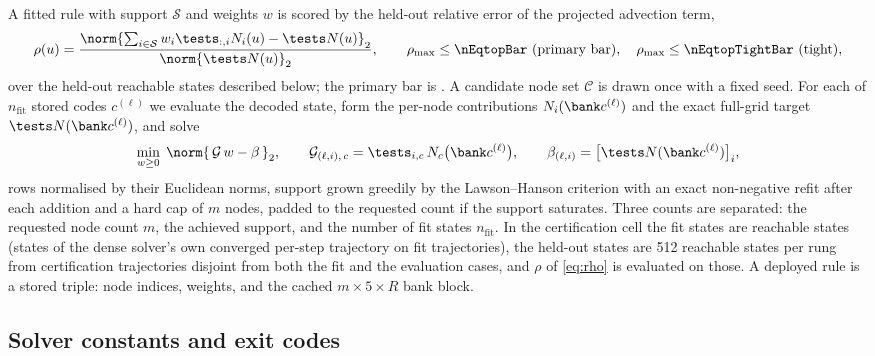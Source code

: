A fitted rule with support $\mathcal S$ and weights $w$ is scored by the
held-out relative error of the projected advection term,
\begin{equation}
  \rho(u)=\frac{\norm{\sum_{i\in\mathcal S}w_i\tests_{:,i}N_i(u)-\tests N(u)}_2}{\norm{\tests N(u)}_2},
  \qquad
  \rho_{\max}\le\nEqtopBar\ \text{(primary bar)},\quad \rho_{\max}\le\nEqtopTightBar\ \text{(tight)},
  \label{eq:rho}
\end{equation}
over the held-out reachable states described below; the primary bar is
\nEqtopBarOrigin. A candidate node set $\mathcal C$ is drawn once with a fixed seed. For each of
$n_{\text{fit}}$ stored codes $c^{(\ell)}$ we evaluate the decoded state, form
the per-node contributions $N_i(\bank c^{(\ell)})$ and the exact full-grid
target $\tests N(\bank c^{(\ell)})$, and solve
\begin{equation}
  \min_{w\ge 0}\;
  \norm{\,\mathcal{G}\,w-\beta\,}_2,
  \qquad
  \mathcal{G}_{(\ell,i),\,c}=\tests_{i,c}\,N_c\big(\bank c^{(\ell)}\big),
  \qquad
  \beta_{(\ell,i)}=\big[\tests N(\bank c^{(\ell)})\big]_i ,
  \label{eq:nnls}
\end{equation}
rows normalised by their Euclidean norms, support grown greedily by the
Lawson--Hanson criterion with an exact non-negative refit after each addition
and a hard cap of $m$ nodes, padded to the requested count if the support
saturates. Three counts are separated: the requested node count $m$, the
achieved support, and the number of fit states $n_{\text{fit}}$. In the
certification cell the fit states are reachable states (states of the dense
solver's own converged per-step trajectory on fit trajectories), the held-out
states are 512 reachable states per rung from certification trajectories
disjoint from both the fit and the evaluation cases, and $\rho$ of
\eqref{eq:rho} is evaluated on those. A deployed rule is a stored triple: node
indices, weights, and the cached $m\times5\times R$ bank block.

\subsection{Solver constants and exit codes}
\label{app:method:codes}

